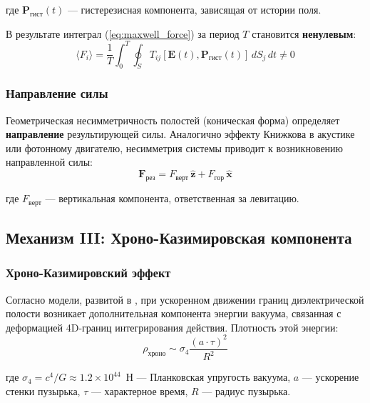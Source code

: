 \documentclass[12pt,a4paper]{article}
\begin{document}
где $\bm{P}_{\text{гист}}(t)$ --- гистерезисная компонента, зависящая от истории поля.

В результате интеграл (\ref{eq:maxwell_force}) за период $T$ становится \textbf{ненулевым}:
\begin{equation}
    \langle F_i \rangle = \frac{1}{T} \int_0^T \oint_S T_{ij}[\bm{E}(t), \bm{P}_{\text{гист}}(t)] \, dS_j \, dt \neq 0
    \label{eq:nonzero_force}
\end{equation}

\subsubsection{Направление силы}

Геометрическая несимметричность полостей (коническая форма) определяет \textbf{направление} результирующей силы. Аналогично эффекту Книжкова в акустике или фотонному двигателю, несимметрия системы приводит к возникновению направленной силы:
\begin{equation}
    \bm{F}_{\text{рез}} = F_{\text{верт}} \, \hat{\bm{z}} + F_{\text{гор}} \, \hat{\bm{x}}
    \label{eq:force_direction}
\end{equation}

где $F_{\text{верт}}$ --- вертикальная компонента, ответственная за левитацию.

\subsection{Механизм III: Хроно-Казимировская компонента}

\subsubsection{Хроно-Казимировский эффект}

Согласно модели, развитой в \cite{chrono_casimir, fermi_1923}, при ускоренном движении границ диэлектрической полости возникает дополнительная компонента энергии вакуума, связанная с деформацией 4D-границ интегрирования действия. Плотность этой энергии:
\begin{equation}
    \rho_{\text{хроно}} \sim \sigma_4 \frac{(a \cdot \tau)^2}{R^2}
    \label{eq:chrono_density}
\end{equation}

где $\sigma_4 = c^4/G \approx 1.2 \times 10^{44}$~Н --- Планковская упругость вакуума, $a$ --- ускорение стенки пузырька, $\tau$ --- характерное время, $R$ --- радиус пузырька.
\end{document}
